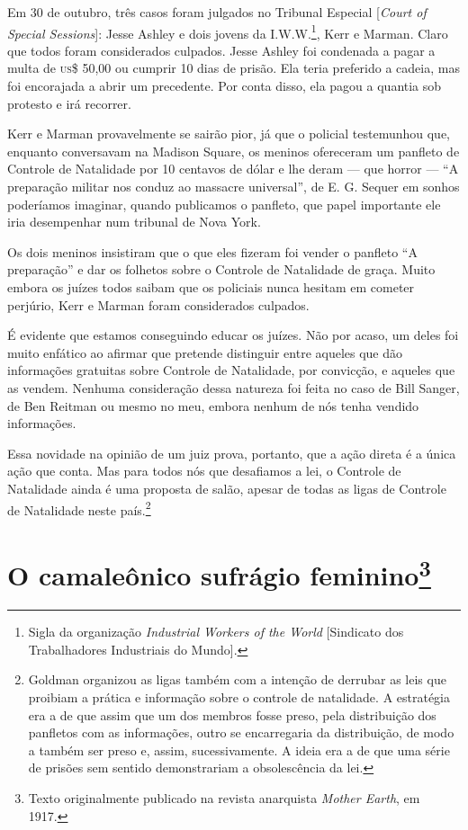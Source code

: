 Em 30 de outubro, três casos foram julgados no Tribunal Especial
{[}\emph{Court of Special Sessions}{]}: Jesse Ashley e dois jovens da
I.W.W.\footnote{Sigla da organização \emph{Industrial Workers of the
  World} {[}Sindicato dos Trabalhadores Industriais do Mundo{]}.}, Kerr
e Marman. Claro que todos foram considerados culpados. Jesse Ashley foi
condenada a pagar a multa de \textsc{us}\$ 50,00 ou cumprir 10 dias de prisão.
Ela teria preferido a cadeia, mas foi encorajada a abrir um precedente.
Por conta disso, ela pagou a quantia sob protesto e irá recorrer.

Kerr e Marman provavelmente se sairão pior, já que o policial
testemunhou que, enquanto conversavam na Madison Square, os meninos
ofereceram um panfleto de Controle de Natalidade por 10 centavos de
dólar e lhe deram --- que horror --- ``A preparação militar nos conduz
ao massacre universal'', de E. G. Sequer em sonhos poderíamos
imaginar, quando publicamos o panfleto, que papel importante ele iria
desempenhar num tribunal de Nova York.

Os dois meninos insistiram que o que eles fizeram foi vender o panfleto
``A preparação'' e dar os folhetos sobre o Controle de Natalidade de
graça. Muito embora os juízes todos saibam que os policiais nunca
hesitam em cometer perjúrio, Kerr e Marman foram considerados culpados.

É evidente que estamos conseguindo educar os juízes. Não por acaso, um
deles foi muito enfático ao afirmar que pretende distinguir entre
aqueles que dão informações gratuitas sobre Controle de Natalidade, por
convicção, e aqueles que as vendem. Nenhuma consideração dessa natureza
foi feita no caso de Bill Sanger, de Ben Reitman ou mesmo no meu, embora
nenhum de nós tenha vendido informações.

Essa novidade na opinião de um juiz prova, portanto, que a ação direta é
a única ação que conta. Mas para todos nós que desafiamos a lei, o
Controle de Natalidade ainda é uma proposta de salão, apesar de todas as
ligas de Controle de Natalidade neste país.\footnote{Goldman organizou
  as ligas também com a intenção de derrubar as leis que proibiam a
  prática e informação sobre o controle de natalidade. A estratégia era
  a de que assim que um dos membros fosse preso, pela distribuição dos panfletos com as informações, outro se encarregaria da distribuição, de modo a também ser preso e, assim, sucessivamente. A ideia era a de que uma série de prisões sem sentido demonstrariam a
  obsolescência da lei.}

\chapter{O camaleônico sufrágio feminino\footnote{Texto originalmente publicado
  na revista anarquista \emph{Mother Earth}, em 1917.}}

